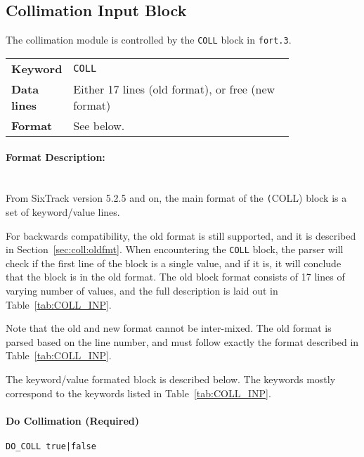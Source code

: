 
\subsection{Collimation Input Block} \label{sec:coll:input}

The collimation module is controlled by the \texttt{COLL} block in \texttt{fort.3}.

\bigskip
\begin{tabular}{@{}lp{0.8\linewidth}}
    \textbf{Keyword}    & \texttt{COLL}\index{COLL} \\
    \textbf{Data lines} & Either 17 lines (old format), or free (new format)\\
    \textbf{Format}     & See below.
\end{tabular}

\paragraph{Format Description:}~\\

From SixTrack version 5.2.5 and on, the main format of the \texttt(COLL) block is a set of keyword/value lines.

For backwards compatibility, the old format is still supported, and it is described in Section~\ref{sec:coll:oldfmt}.
When encountering the \texttt{COLL} block, the parser will check if the first line of the block is a single value, and if it is, it will conclude that the block is in the old format.
The old block format consists of 17 lines of varying number of values, and the full description is laid out in Table~\ref{tab:COLL_INP}.

Note that the old and new format cannot be inter-mixed.
The old format is parsed based on the line number, and must follow exactly the format described in Table~\ref{tab:COLL_INP}.

The keyword/value formated block is described below.
The keywords mostly correspond to the keywords listed in Table~\ref{tab:COLL_INP}.

\paragraph{Do Collimation (Required)} \texttt{DO\_COLL true|false}\\

